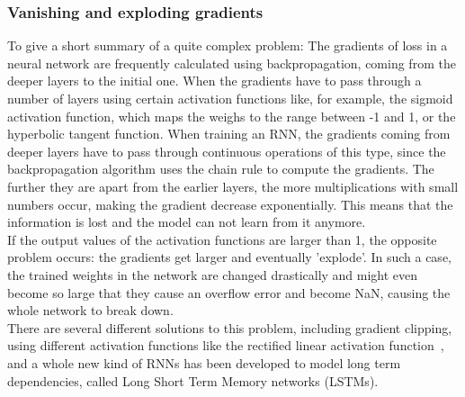 \documentclass[
a4paper,
pagesize,
pdftex,
12pt,
twoside, %
BCOR=5mm, %
ngerman,
fleqn,
final,
]{scrartcl}
\begin{document}
	\subsubsection{Vanishing and exploding gradients}
	To give a short summary of a quite complex problem: The gradients of loss in a neural network are frequently calculated using backpropagation, coming from the deeper layers to the initial one. When the gradients have to pass through a number of layers using certain activation functions like, for example, the sigmoid activation function, which maps the weighs to the range between -1 and 1, or the hyperbolic tangent function. When training an RNN, the gradients coming from deeper layers have to pass through continuous operations of this type, since the backpropagation algorithm uses the chain rule to compute the gradients. The further they are apart from the earlier layers, the more multiplications with small numbers occur, making the gradient decrease exponentially. This means that the information is lost and the model can not learn from it anymore.\\
	If the output values of the activation functions are larger than 1, the opposite problem occurs: the gradients get larger and eventually 'explode'. In such a case, the trained weights in the network are changed drastically and might even become so large that they cause an overflow error and become NaN, causing the whole network to break down.\\
	There are several different solutions to this problem, including gradient clipping, using different activation functions like the rectified linear activation function~\cite{Glorot.2011}, and a whole new kind of RNNs has been developed to model long term dependencies, called Long Short Term Memory networks (LSTMs).
	
\end{document}
